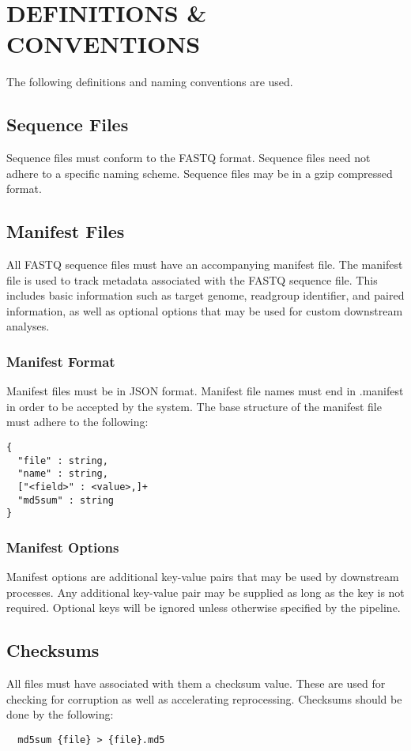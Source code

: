 \section{DEFINITIONS \& CONVENTIONS}
The following definitions and naming conventions are used.

\subsection{Sequence Files}
Sequence files must conform to the FASTQ format. Sequence files need not adhere to a specific naming scheme. Sequence files may be in a gzip compressed format.

\subsection{Manifest Files}
All FASTQ sequence files must have an accompanying manifest file. The manifest file is used to track metadata associated with the FASTQ sequence file. This includes basic information such as target genome, readgroup identifier, and paired information, as well as optional options that may be used for custom downstream analyses.

\subsubsection{Manifest Format}
Manifest files must be in JSON format. Manifest file names must end in .manifest in order to be accepted by the system. The base structure of the manifest file must adhere to the following:
\begin{verbatim}
{
  "file" : string,
  "name" : string,
  ["<field>" : <value>,]+
  "md5sum" : string
}
\end{verbatim}

\subsubsection{Manifest Options}
Manifest options are additional key-value pairs that may be used by downstream processes. Any additional key-value pair may be supplied as long as the key is not required. Optional keys will be ignored unless otherwise specified by the pipeline.

\subsection{Checksums}
All files must have associated with them a checksum value. These are used for checking for corruption as well as accelerating reprocessing. Checksums should be done by the following:
\begin{verbatim}
  md5sum {file} > {file}.md5
\end{verbatim}
